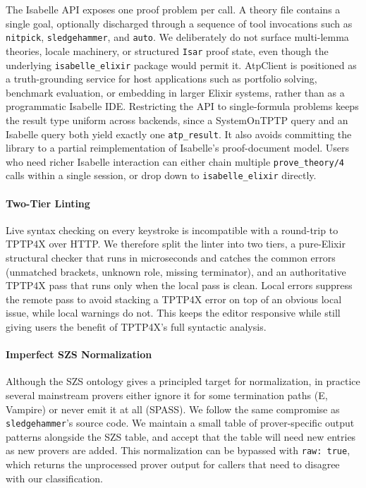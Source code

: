 \documentclass[]{ceurart}
\begin{document}
The Isabelle API exposes one proof problem per call. A theory file contains a single goal, optionally discharged through a sequence of tool invocations such as \texttt{nitpick}, \texttt{sledgehammer}, and \texttt{auto}. We deliberately do not surface multi-lemma theories, locale machinery, or structured \texttt{Isar} proof state, even though the underlying \texttt{isabelle\_elixir} package would permit it. AtpClient is positioned as a truth-grounding service for host applications such as portfolio solving, benchmark evaluation, or embedding in larger Elixir systems, rather than as a programmatic Isabelle IDE. Restricting the API to single-formula problems keeps the result type uniform across backends, since a SystemOnTPTP query and an Isabelle query both yield exactly one \texttt{atp\_result}. It also avoids committing the library to a partial reimplementation of Isabelle's proof-document model. Users who need richer Isabelle interaction can either chain multiple \texttt{prove\_theory/4} calls within a single session, or drop down to \texttt{isabelle\_elixir} directly.

\paragraph{Two-Tier Linting}

Live syntax checking on every keystroke is incompatible with a round-trip to TPTP4X over HTTP. We therefore split the linter into two tiers, a pure-Elixir structural checker that runs in microseconds and catches the common errors (unmatched brackets, unknown role, missing terminator), and an authoritative TPTP4X pass that runs only when the local pass is clean. Local errors suppress the remote pass to avoid stacking a TPTP4X error on top of an obvious local issue, while local warnings do not. This keeps the editor responsive while still giving users the benefit of TPTP4X's full syntactic analysis.

\paragraph{Imperfect SZS Normalization}

Although the SZS ontology gives a principled target for normalization, in practice several mainstream provers either ignore it for some termination paths (E, Vampire) or never emit it at all (SPASS). We follow the same compromise as \texttt{sledgehammer}'s source code. We maintain a small table of prover-specific output patterns alongside the SZS table, and accept that the table will need new entries as new provers are added. This normalization can be bypassed with \texttt{raw: true}, which returns the unprocessed prover output for callers that need to disagree with our classification.
\end{document}
